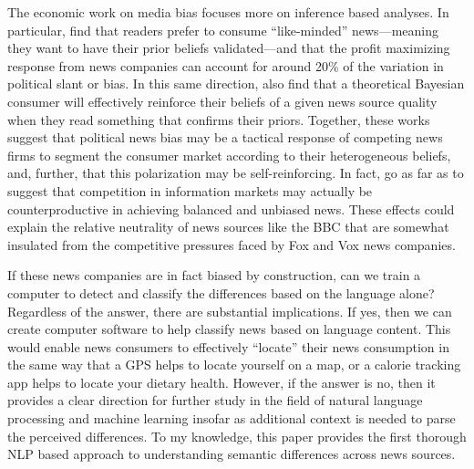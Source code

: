 \documentclass{article}
\begin{document}
		The economic work on media bias focuses more on inference based analyses. In particular, \citet{gentzkow2010drives} find that readers prefer to consume ``like-minded'' news---meaning they want to have their prior beliefs validated---and that the profit maximizing response from news companies can account for around 20\% of the variation in political slant or bias. In this same direction, \citet{gentzkow2006media} also find that a theoretical Bayesian consumer will effectively reinforce their beliefs of a given news source quality when they read something that confirms their priors. Together, these works suggest that political news bias may be a tactical response of competing news firms to segment the consumer market according to their heterogeneous beliefs, and, further, that this polarization may be self-reinforcing. In fact, \citet{gentzkow2008competition} go as far as to suggest that competition in information markets may actually be counterproductive in achieving balanced and unbiased news. These effects could explain the relative neutrality of news sources like the BBC that are somewhat insulated from the competitive pressures faced by Fox and Vox news companies. 
		
		If these news companies are in fact biased by construction, can we train a computer to detect and classify the differences based on the language alone? Regardless of the answer, there are substantial implications. If yes, then we can create computer software to help classify news based on language content. This would enable news consumers to effectively ``locate'' their news consumption in the same way that a GPS helps to locate yourself on a map, or a calorie tracking app helps to locate your dietary health. However, if the answer is no, then it provides a clear direction for further study in the field of natural language processing and machine learning insofar as additional context is needed to parse the perceived differences. To my knowledge, this paper provides the first thorough NLP based approach to understanding semantic differences across news sources. 
		
\end{document}
